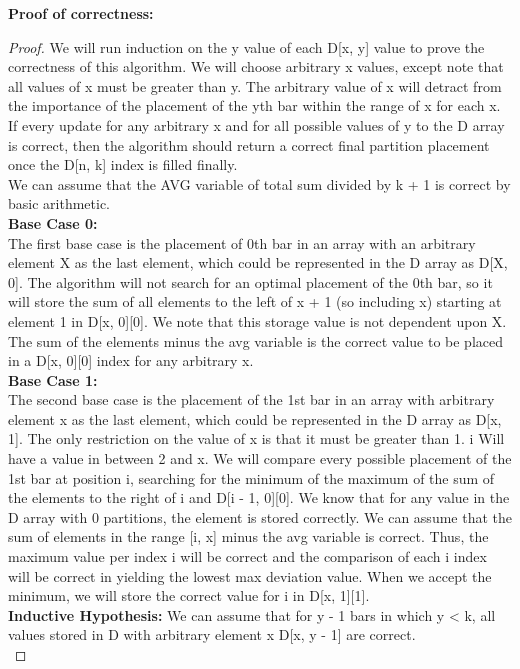 \documentclass[11pt, solution, letterpaper]{format}
\begin{document}
\textbf{Proof of correctness: }
\begin{proof} We will run induction on the y value of each D[x, y] value to prove the correctness of this algorithm. We will choose arbitrary x values, except note that all values of x must be greater than y. The arbitrary value of x will detract from the importance of the placement of the yth bar within the range of x for each x. If every update for any arbitrary x and for all possible values of y to the D array is correct, then the algorithm should return a correct final partition placement once the D[n, k] index is filled finally. \\

We can assume that the AVG variable of total sum divided by k + 1 is correct by basic arithmetic. \\

\textbf{Base Case 0:}\\ The first base case is the placement of 0th bar in an array with an arbitrary element X as the last element, which could be represented in the D array as D[X, 0]. The algorithm will not search for an optimal placement of the 0th bar, so it will store the sum of all elements to the left of x + 1 (so including x) starting at element 1 in D[x, 0][0]. We note that this storage value is not dependent upon X. The sum of the elements minus the avg variable is the correct value to be placed in a D[x, 0][0] index for any arbitrary x. \\

\textbf{Base Case 1:}\\ The second base case is the placement of the 1st bar in an array with arbitrary element x as the last element, which could be represented in the D array as D[x, 1]. The only restriction on the value of x is that it must be greater than 1. i Will have a value in between 2 and x. We will compare every possible placement of the 1st bar at position i, searching for the minimum of the maximum of the sum of the elements to the right of i and D[i - 1, 0][0]. We know that for any value in the D array with 0 partitions, the element is stored correctly. We can assume that the sum of elements in the range [i, x] minus the avg variable is correct. Thus, the maximum value per index i will be correct and the comparison of each i index will be correct in yielding the lowest max deviation value. When we accept the minimum, we will store the correct value for i in D[x, 1][1].\\

\textbf{Inductive Hypothesis:} We can assume that for y - 1 bars in which y < k, all values stored in D with arbitrary element x D[x, y - 1] are correct. \\


\end{proof}
\end{document}

